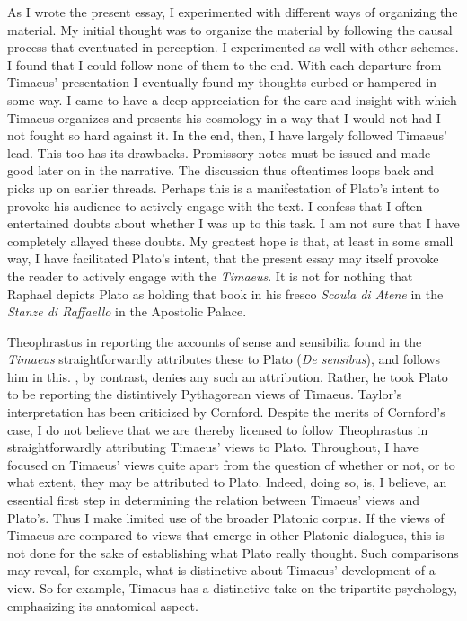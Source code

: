 As I wrote the present essay, I experimented with different ways of organizing the material. My initial thought was to organize the material by following the causal process that eventuated in perception. I experimented as well with other schemes. I found that I could follow none of them to the end. With each departure from Timaeus' presentation I eventually found my thoughts curbed or hampered in some way. I came to have a deep appreciation for the care and insight with which Timaeus organizes and presents his cosmology in a way that I would not had I not fought so hard against it. In the end, then, I have largely followed Timaeus' lead. This too has its drawbacks. Promissory notes must be issued and made good later on in the narrative. The discussion thus oftentimes loops back and picks up on earlier threads. Perhaps this is a manifestation of Plato's intent to provoke his audience to actively engage with the text. I confess that I often entertained doubts about whether I was up to this task. I am not sure that I have completely allayed these doubts. My greatest hope is that, at least in some small way, I have facilitated Plato's intent, that the present essay may itself provoke the reader to actively engage with the \emph{Timaeus}. It is not for nothing that Raphael depicts Plato as holding that book in his fresco \emph{Scoula di Atene} in the \emph{Stanze di Raffaello} in the Apostolic Palace.

Theophrastus in reporting the accounts of sense and sensibilia found in the \emph{Timaeus} straightforwardly attributes these to Plato (\emph{De sensibus}), and \citet{Cornford:1935fk} follows him in this. \citet{Taylor:1928qb}, by contrast, denies any such an attribution. Rather, he took Plato to be reporting the distintively Pythagorean views of Timaeus. Taylor's interpretation has been criticized by Cornford. Despite the merits of Cornford's case, I do not believe that we are thereby licensed to follow Theophrastus in straightforwardly attributing Timaeus' views to Plato. Throughout, I have focused on Timaeus' views quite apart from the question of whether or not, or to what extent, they may be attributed to Plato. Indeed, doing so, is, I believe, an essential first step in determining the relation between Timaeus' views and Plato's. Thus I make limited use of the broader Platonic corpus. If the views of Timaeus are compared to views that emerge in other Platonic dialogues, this is not done for the sake of establishing what Plato really thought. Such comparisons may reveal, for example, what is distinctive about Timaeus' development of a view. So for example, Timaeus has a distinctive take on the tripartite psychology, emphasizing its anatomical aspect.

